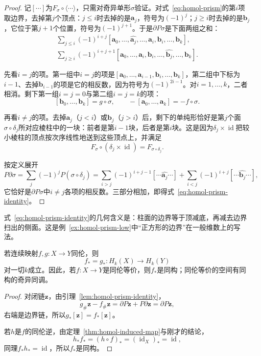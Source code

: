 \begin{proof}
记$[\cdots]$为$F_\sigma\circ\langle\cdots\rangle$，只需对奇异单形$\sigma$验证。对式~\eqref{eq:homol-prism}的第$i$项取边界，去掉第$j$个顶点：$j\leq i$时去掉的是$\bm a_j$，符号为$(-1)^j$；$j\geq i$时去掉的是$\bm b_j$，它位于第$j+1$个位置，符号为$(-1)^{j+1}$。于是$\partial P\sigma$是下面两组之和：
\begin{gather*}
 \sum_{j\leq i}(-1)^{i+j}[\bm a_0,\ldots,\widehat{\bm a_j},\ldots,\bm a_i,\bm b_i,\ldots,\bm b_k],\\
 \sum_{j\geq i}(-1)^{i+j+1}[\bm a_0,\ldots,\bm a_i,\bm b_i,\ldots,\widehat{\bm b_j},\ldots,\bm b_k].
\end{gather*}

先看$i=j$的项。第一组中$i=j$的项是$[\bm a_0,\ldots,\bm a_{i-1},\bm b_i,\ldots,\bm b_k]$，第二组中下标为$i-1$、去掉$\bm b_{i-1}$的项是它的相反数，因为符号为$(-1)^{2i-1}$。对$i=1,\ldots,k$，二者相消。剩下第一组$i=j=0$与第二组$i=j=k$的项：
\[
 [\bm b_0,\ldots,\bm b_k]=g\circ\sigma,\qquad-[\bm a_0,\ldots,\bm a_k]=-f\circ\sigma.
\]

再看$i\neq j$的项。去掉$\bm a_j$（$j<i$）或$\bm b_j$（$j>i$）后，剩下的单纯形恰好是第$j$个面$\sigma\circ\delta_j$所对应棱柱中的一块：前者是第$i-1$块，后者是第$i$块。这是因为$\delta_j\times\operatorname{id}$把较小棱柱的顶点按次序线性地送到这些顶点上，并满足
\[
 F_\sigma\circ(\delta_j\times\operatorname{id})=F_{\sigma\circ\delta_j}.
\]

按定义展开
\[
 P\partial\sigma=\sum_j(-1)^jP(\sigma\circ\delta_j)
 =\sum_{i>j}(-1)^{i+j-1}[\cdots\widehat{\bm a_j}\cdots]+\sum_{i<j}(-1)^{i+j}[\cdots\widehat{\bm b_j}\cdots],
\]
它恰好是$\partial P\sigma$中$i\neq j$各项的相反数。三部分相加，即得式~\eqref{eq:homol-prism-identity}。
\end{proof}

式~\eqref{eq:homol-prism-identity}的几何含义是：柱面的边界等于顶减底，再减去边界扫出的侧面。这是例~\ref{ex:homol-prism-low}中“正方形的边界”在一般维数上的写法。

\begin{theorem}[同伦不变性]
\label{thm:homol-homotopy-invariance}
若连续映射$f,g:X\to Y$同伦，则
\begin{equation}
 f_*=g_*:H_k(X)\to H_k(Y)
 \label{eq:homol-homotopy-invariance}
\end{equation}
对一切$k$成立。因此，若$f:X\to Y$是同伦等价，则$f_*$是同构；同伦等价的空间有同构的奇异同调。
\end{theorem}

\begin{proof}
对闭链$\bm z$，由引理~\ref{lem:homol-prism-identity}，
\[
 g_\#\bm z-f_\#\bm z=\partial P\bm z+P\partial\bm z=\partial P\bm z,
\]
右端是边界链，所以$g_*[\bm z]=f_*[\bm z]$。

若$h$是$f$的同伦逆，由定理~\ref{thm:homol-induced-map}与刚才的结论，
\[
 h_*f_*=(h\circ f)_*=(\operatorname{id}_X)_*=\operatorname{id},
\]
同理$f_*h_*=\operatorname{id}$，所以$f_*$是同构。
\end{proof}

